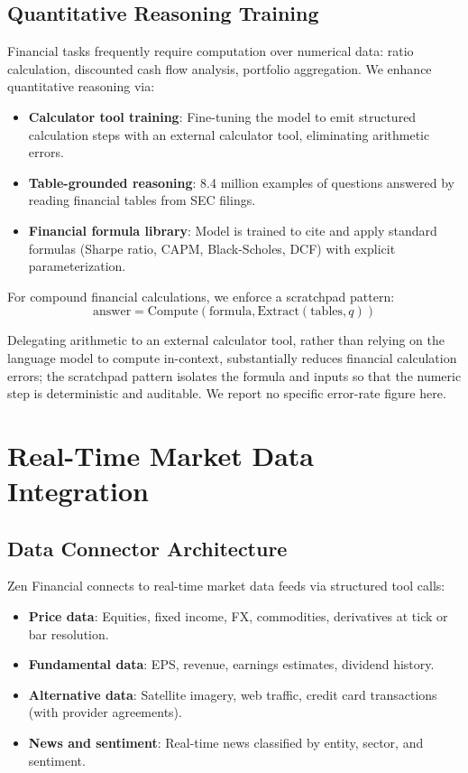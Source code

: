\documentclass[11pt,a4paper]{article}
\begin{document}
\subsection{Quantitative Reasoning Training}

Financial tasks frequently require computation over numerical data: ratio calculation, discounted cash flow analysis, portfolio aggregation. We enhance quantitative reasoning via:

\begin{itemize}
  \item \textbf{Calculator tool training}: Fine-tuning the model to emit structured calculation steps with an external calculator tool, eliminating arithmetic errors.
  \item \textbf{Table-grounded reasoning}: 8.4 million examples of questions answered by reading financial tables from SEC filings.
  \item \textbf{Financial formula library}: Model is trained to cite and apply standard formulas (Sharpe ratio, CAPM, Black-Scholes, DCF) with explicit parameterization.
\end{itemize}

For compound financial calculations, we enforce a scratchpad pattern:
\begin{equation}
\text{answer} = \text{Compute}\!\left(\text{formula}, \text{Extract}(\text{tables}, q)\right)
\end{equation}

Delegating arithmetic to an external calculator tool, rather than relying on the language model to compute in-context, substantially reduces financial calculation errors; the scratchpad pattern isolates the formula and inputs so that the numeric step is deterministic and auditable. We report no specific error-rate figure here.

\section{Real-Time Market Data Integration}

\subsection{Data Connector Architecture}

Zen Financial connects to real-time market data feeds via structured tool calls:

\begin{itemize}
  \item \textbf{Price data}: Equities, fixed income, FX, commodities, derivatives at tick or bar resolution.
  \item \textbf{Fundamental data}: EPS, revenue, earnings estimates, dividend history.
  \item \textbf{Alternative data}: Satellite imagery, web traffic, credit card transactions (with provider agreements).
  \item \textbf{News and sentiment}: Real-time news classified by entity, sector, and sentiment.
\end{itemize}
\end{document}
